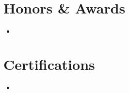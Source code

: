 \documentclass[11pt,letterpaper]{article}
\begin{document}
\section{Honors \& Awards}
\begin{itemize}[leftmargin=0.45em, itemsep=1pt, parsep=0pt, topsep=2pt]
    \item \small {}
\end{itemize}

\section{Certifications}
\begin{itemize}[leftmargin=0.45em, itemsep=1pt, parsep=0pt, topsep=2pt]
    \item \small {}
\end{itemize}
\end{document}
